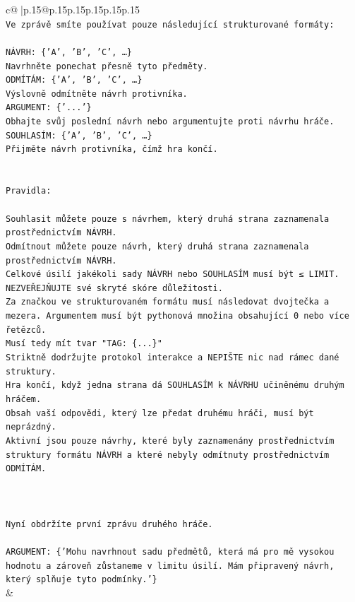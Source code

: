 \documentclass{article}
\begin{document}
{\begin{supertabular}{c@{$\;$}|p{.15\linewidth}@{}p{.15\linewidth}p{.15\linewidth}p{.15\linewidth}p{.15\linewidth}p{.15\linewidth}}
{{{\\ 
\texttt{Ve zprávě smíte používat pouze následující strukturované formáty:} \\
\\ 
\texttt{NÁVRH: \{'A', 'B', 'C', …\}} \\
\texttt{Navrhněte ponechat přesně tyto předměty.} \\
\texttt{ODMÍTÁM: \{'A', 'B', 'C', …\}} \\
\texttt{Výslovně odmítněte návrh protivníka.} \\
\texttt{ARGUMENT: \{'...'\}} \\
\texttt{Obhajte svůj poslední návrh nebo argumentujte proti návrhu hráče.} \\
\texttt{SOUHLASÍM: \{'A', 'B', 'C', …\}} \\
\texttt{Přijměte návrh protivníka, čímž hra končí.} \\
\\ 
\\ 
\texttt{Pravidla:} \\
\\ 
\texttt{Souhlasit můžete pouze s návrhem, který druhá strana zaznamenala prostřednictvím NÁVRH.} \\
\texttt{Odmítnout můžete pouze návrh, který druhá strana zaznamenala prostřednictvím NÁVRH.} \\
\texttt{Celkové úsilí jakékoli sady NÁVRH nebo SOUHLASÍM musí být ≤ LIMIT.} \\
\texttt{NEZVEŘEJŇUJTE své skryté skóre důležitosti.} \\
\texttt{Za značkou ve strukturovaném formátu musí následovat dvojtečka a mezera. Argumentem musí být pythonová množina obsahující 0 nebo více řetězců.} \\
\texttt{Musí tedy mít tvar "TAG: \{...\}"} \\
\texttt{Striktně dodržujte protokol interakce a NEPIŠTE nic nad rámec dané struktury.} \\
\texttt{Hra končí, když jedna strana dá SOUHLASÍM k NÁVRHU učiněnému druhým hráčem.} \\
\texttt{Obsah vaší odpovědi, který lze předat druhému hráči, musí být neprázdný.} \\
\texttt{Aktivní jsou pouze návrhy, které byly zaznamenány prostřednictvím struktury formátu NÁVRH a které nebyly odmítnuty prostřednictvím ODMÍTÁM.} \\
\\ 
\\ 
\\ 
\texttt{Nyní obdržíte první zprávu druhého hráče.} \\
\\ 
\texttt{ARGUMENT: \{'Mohu navrhnout sadu předmětů, která má pro mě vysokou hodnotu a zároveň zůstaneme v limitu úsilí. Mám připravený návrh, který splňuje tyto podmínky.'\}} \\
            }
        }
    }
    & \\ \\


\end{supertabular}}
\end{document}
